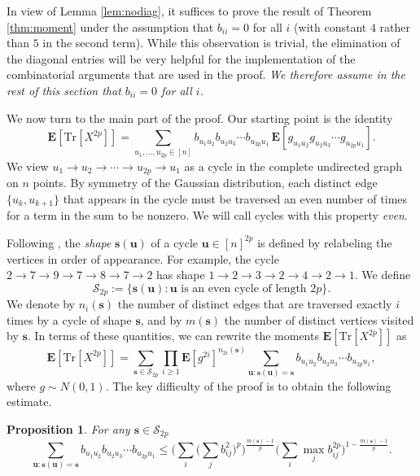 \documentclass[10pt,reqno]{amsart}
\newtheorem{prop}[thm]{Proposition}
\theoremstyle{definition}
\numberwithin{equation}{section}
\numberwithin{figure}{section}
\numberwithin{table}{section}
\begin{document}
In view of Lemma \ref{lem:nodiag}, it suffices to prove the result of 
Theorem \ref{thm:moment} under the assumption that $b_{ii}=0$ for all $i$ 
(with constant $4$ rather than $5$ in the second term). While this 
observation is trivial, the elimination of the diagonal entries will be 
very helpful for the implementation of the combinatorial arguments that 
are used in the proof. \emph{We therefore assume in the rest of 
this section that $b_{ii}=0$ for all $i$.}

We now turn to the main part of the proof. Our starting point is the 
identity
$$
	\mathbf{E}[\mathrm{Tr}[X^{2p}]] =
	\sum_{u_1,\ldots,u_{2p}\in[n]}
	b_{u_1u_2}b_{u_2u_3}\cdots b_{u_{2p}u_1}
	\,\mathbf{E}[g_{u_1u_2}g_{u_2u_3}\cdots g_{u_{2p}u_1}].
$$
We view $u_1\to u_2\to\cdots\to u_{2p}\to u_1$ as a cycle in the complete 
undirected graph on $n$ points. By symmetry of the
Gaussian distribution, each distinct edge $\{u_k,u_{k+1}\}$ that appears 
in the cycle must be traversed an even number of times for a term in the 
sum to be nonzero. We will call cycles with this property \emph{even}.

Following \cite{BvH16}, the \emph{shape} $\mathbf{s}(\mathbf{u})$ of a
cycle $\mathbf{u}\in[n]^{2p}$ is defined by relabeling the vertices in
order of appearance. For example, the cycle $2\to 7\to 9\to 7\to 8\to 
7\to 2$ has shape $1\to 2\to 3\to 2\to 4\to 2\to 1$. We define
$$
	\mathcal{S}_{2p}:=
	\{\mathbf{s}(\mathbf{u}):\mathbf{u}\mbox{ is an even
	cycle of length }2p\}.
$$
We denote by $n_i(\mathbf{s})$ the number of distinct edges that
are traversed exactly $i$ times by a cycle of shape $\mathbf{s}$, and
by $m(\mathbf{s})$ the number of distinct vertices visited by $\mathbf{s}$.
In terms of these quantities, we can rewrite the moments
$\mathbf{E}[\mathrm{Tr}[X^{2p}]]$ as
$$
	\mathbf{E}[\mathrm{Tr}[X^{2p}]] =
	\sum_{\mathbf{s}\in\mathcal{S}_{2p}}
	\prod_{i\ge 1} \mathbf{E}[g^{2i}]^{n_{2i}(\mathbf{s})}
	\sum_{\mathbf{u}:\mathbf{s}(\mathbf{u})=\mathbf{s}}
	b_{u_1u_2}b_{u_2u_3}\cdots b_{u_{2p}u_1},
$$
where $g\sim N(0,1)$.
The key difficulty of the proof is to obtain the following estimate.

\begin{prop}
\label{prop:holder}
For any $\mathbf{s}\in\mathcal{S}_{2p}$
$$
	\sum_{\mathbf{u}:\mathbf{s}(\mathbf{u})=\mathbf{s}}
	b_{u_1u_2}b_{u_2u_3}\cdots b_{u_{2p}u_1}
	\le
	\Bigg(\sum_i\Bigg(\sum_j b_{ij}^2\Bigg)^p\Bigg)^{\frac{m(\mathbf{s})-1}{p}}
	\Bigg(\sum_i \max_j b_{ij}^{2p}\Bigg)^{1-\frac{m(\mathbf{s})-1}{p}}.
$$
\end{prop}
\end{document}
